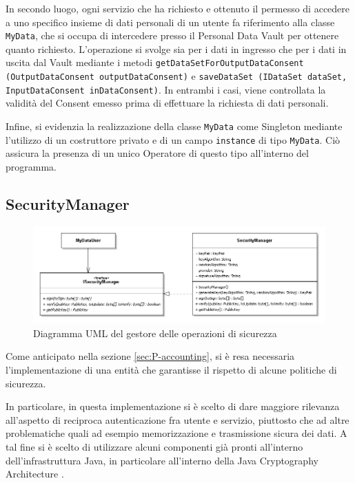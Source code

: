 In secondo luogo, ogni servizio che ha richiesto e ottenuto il permesso di accedere a uno specifico insieme di dati personali di un utente fa riferimento alla classe \texttt{MyData}, che si occupa di intercedere presso il Personal Data Vault per ottenere quanto richiesto. L’operazione si svolge sia per i dati in ingresso che per i dati in uscita dal Vault mediante i metodi \texttt{getDataSetForOutputDataConsent (OutputDataConsent outputDataConsent)} e \texttt{saveDataSet (IDataSet dataSet, InputDataConsent inDataConsent)}. In entrambi i casi, viene controllata la validit\`a del Consent emesso prima di effettuare la richiesta di dati personali.

Infine, si evidenzia la realizzazione della classe \texttt{MyData} come Singleton mediante l’utilizzo di un costruttore privato e di un campo \texttt{instance} di tipo \texttt{MyData}. Ci\`o assicura la presenza di un unico Operatore di questo tipo all’interno del programma.

\subsection{SecurityManager}
\label{subsec:P-SecMan}
\begin{figure} [h]
	\includegraphics[width=\linewidth]{pictures/Accounting-SecurityManager.png}
	\caption{Diagramma UML del gestore delle operazioni di sicurezza}
	\label{fig:Accounting-SecurityManager}
\end{figure}
Come anticipato nella sezione \ref{sec:P-accounting}, si \`e resa necessaria l'implementazione di una entit\`a che garantisse il rispetto di alcune politiche di sicurezza.

In particolare, in questa implementazione si \`e scelto di dare maggiore rilevanza all'aspetto di reciproca autenticazione fra utente e servizio, piuttosto che ad altre problematiche quali ad esempio memorizzazione e trasmissione sicura dei dati. A tal fine si \`e scelto di utilizzare alcuni componenti gi\`a pronti all'interno dell'infrastruttura Java, in particolare all'interno della Java Cryptography Architecture \cite{javacrypto}.

